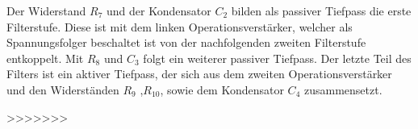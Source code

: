 \noindent
Der Widerstand $R_7$ und der Kondensator $C_2$ bilden als passiver Tiefpass die erste Filterstufe. Diese ist mit dem linken Operationsverstärker, welcher als Spannungsfolger beschaltet ist von der nachfolgenden zweiten Filterstufe entkoppelt. Mit $R_8$ und $C_3$ folgt ein weiterer passiver Tiefpass. Der letzte Teil des Filters ist ein aktiver Tiefpass, der sich aus dem zweiten Operationsverstärker und den Widerständen $R_9$ ,$R_{10}$, sowie dem Kondensator $C_4$ zusammensetzt.








>>>>>>>